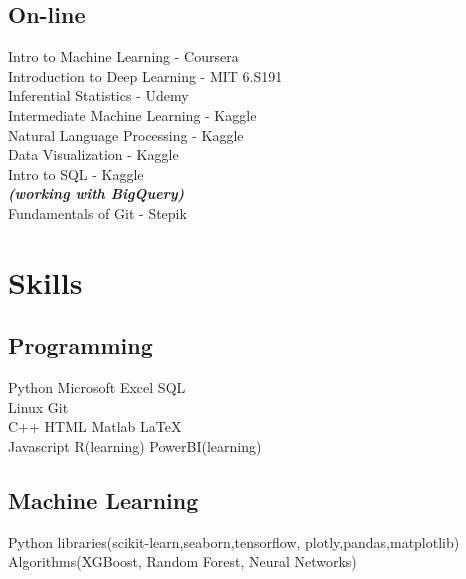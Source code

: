 \documentclass[]{deedy-resume-openfont}
\begin{document}
\begin{minipage}[t]{0.33\textwidth}
\subsection{On-line}
Intro to Machine Learning - Coursera\\
Introduction to Deep Learning - MIT 6.S191\\
Inferential Statistics - Udemy\\
Intermediate Machine Learning - Kaggle\\
Natural Language Processing - Kaggle\\
Data Visualization - Kaggle\\
Intro to SQL - Kaggle\\
{\footnotesize \textit{\textbf{(working with BigQuery) }}} \\
Fundamentals of Git - Stepik\\



\section{Skills}
\subsection{Programming}
Python \textbullet{}  Microsoft Excel\textbullet{} SQL\textbullet{} \\
Linux \textbullet{} Git \textbullet{}\\ 
C++ \textbullet{} HTML \textbullet{} Matlab \textbullet{} \LaTeX\textbullet{} \\
Javascript \textbullet{} R(learning) \textbullet{}  PowerBI(learning)\textbullet{}
\sectionsep

\subsection{Machine Learning}
Python libraries(scikit-learn,seaborn,tensorflow, plotly,pandas,matplotlib) \textbullet{}  Algorithms(XGBoost, Random Forest, Neural Networks)\textbullet{} 
\sectionsep

%
%

\end{minipage} 
\end{document}
